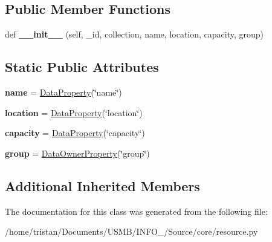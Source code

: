 \subsection*{Public Member Functions}
\begin{DoxyCompactItemize}
\item 
\mbox{\label{classSource_1_1core_1_1resource_1_1Resource_a1d4a67c41ffbf552a7930efa53b649d1}} 
def {\bfseries \+\_\+\+\_\+init\+\_\+\+\_\+} (self, \+\_\+id, collection, name, location, capacity, group)
\end{DoxyCompactItemize}
\subsection*{Static Public Attributes}
\begin{DoxyCompactItemize}
\item 
\mbox{\label{classSource_1_1core_1_1resource_1_1Resource_aa7442c19118b55022614af28009c9aef}} 
{\bfseries name} = \mbox{\hyperlink{classSource_1_1core_1_1dataproperty_1_1DataProperty}{Data\+Property}}(\char`\"{}name\char`\"{})
\item 
\mbox{\label{classSource_1_1core_1_1resource_1_1Resource_adda385d0e316dfb2bdec55889f030166}} 
{\bfseries location} = \mbox{\hyperlink{classSource_1_1core_1_1dataproperty_1_1DataProperty}{Data\+Property}}(\char`\"{}location\char`\"{})
\item 
\mbox{\label{classSource_1_1core_1_1resource_1_1Resource_a1e3aaabaa9676995cf80741ca85952a2}} 
{\bfseries capacity} = \mbox{\hyperlink{classSource_1_1core_1_1dataproperty_1_1DataProperty}{Data\+Property}}(\char`\"{}capacity\char`\"{})
\item 
\mbox{\label{classSource_1_1core_1_1resource_1_1Resource_afafd9b0001684bcab9a126ee4f632e6f}} 
{\bfseries group} = \mbox{\hyperlink{classSource_1_1core_1_1dataproperty_1_1DataOwnerProperty}{Data\+Owner\+Property}}(\char`\"{}group\char`\"{})
\end{DoxyCompactItemize}
\subsection*{Additional Inherited Members}


The documentation for this class was generated from the following file\+:\begin{DoxyCompactItemize}
\item 
/home/tristan/\+Documents/\+U\+S\+M\+B/\+I\+N\+F\+O\+\_/\+Source/core/resource.\+py\end{DoxyCompactItemize}
